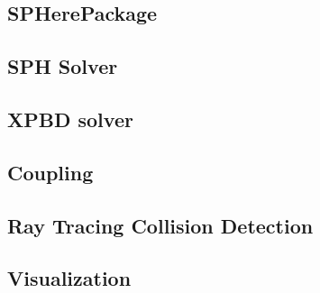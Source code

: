 \subsection{SPHerePackage}

\subsection{SPH Solver}

\subsection{XPBD solver}

\subsection{Coupling}

\subsection{Ray Tracing Collision Detection}

\subsection{Visualization}
